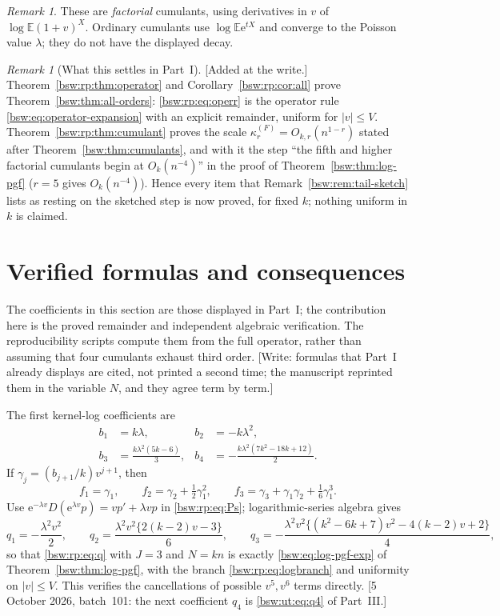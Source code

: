 \documentclass[11pt,letterpaper]{article}
\theoremstyle{definition}
\theoremstyle{remark}
\newtheorem{remark}[theorem]{Remark}
\newcommand{\EE}{\mathbb E}
\newcommand{\ee}{\mathrm e}
\begin{document}
\begin{remark}\label{bsw:rp:rem:factorial}
These are \emph{factorial} cumulants, using derivatives in $v$ of
$\log\EE(1+v)^X$.  Ordinary cumulants use $\log\EE\ee^{tX}$ and converge to
the Poisson value $\lambda$; they do not have the displayed decay.
\end{remark}

\begin{remark}[What this settles in Part~I]\label{bsw:rp:rem:settles}
[Added at the write.]  Theorem~\ref{bsw:rp:thm:operator} and
Corollary~\ref{bsw:rp:cor:all} prove Theorem~\ref{bsw:thm:all-orders}:
\eqref{bsw:rp:eq:operr} is the operator rule
\eqref{bsw:eq:operator-expansion} with an explicit remainder, uniform for
$|v|\le V$.  Theorem~\ref{bsw:rp:thm:cumulant} proves the scale
$\kappa_r^{(F)}=O_{k,r}(n^{1-r})$ stated after
Theorem~\ref{bsw:thm:cumulants}, and with it the step ``the fifth and
higher factorial cumulants begin at $O_k(n^{-4})$'' in the proof of
Theorem~\ref{bsw:thm:log-pgf} ($r=5$ gives $O_k(n^{-4})$).  Hence every
item that Remark~\ref{bsw:rem:tail-sketch} lists as resting on the sketched
step is now proved, for fixed $k$; nothing uniform in $k$ is claimed.
\end{remark}

\section{Verified formulas and consequences}\label{bsw:rp:sec:verified}

The coefficients in this section are those displayed in Part~I; the
contribution here is the proved remainder and independent algebraic
verification.  The reproducibility scripts compute them from the full
operator, rather than assuming that four cumulants exhaust third order.
[Write: formulas that Part~I already displays are cited, not printed a
second time; the manuscript reprinted them in the variable $N$, and they
agree term by term.]

The first kernel-log coefficients are
\begin{align*}
 b_1&=k\lambda,& b_2&=-k\lambda^2,\\
 b_3&=\frac{k\lambda^2(5k-6)}3,&
 b_4&=-\frac{k\lambda^2(7k^2-18k+12)}2.
\end{align*}
If $\gamma_j=(b_{j+1}/k)v^{j+1}$, then
\[
 f_1=\gamma_1,\qquad f_2=\gamma_2+\tfrac12\gamma_1^2,\qquad
 f_3=\gamma_3+\gamma_1\gamma_2+\tfrac16\gamma_1^3.
\]
Use $\ee^{-\lambda v}D(\ee^{\lambda v}p)=vp'+\lambda vp$ in
\eqref{bsw:rp:eq:Ps}; logarithmic-series algebra gives
\begin{equation}\label{bsw:rp:eq:q123}
 q_1=-\frac{\lambda^2v^2}{2},\qquad
 q_2=\frac{\lambda^2v^2\{2(k-2)v-3\}}{6},\qquad
 q_3=-\frac{\lambda^2v^2\{(k^2-6k+7)v^2-4(k-2)v+2\}}{4},
\end{equation}
so that \eqref{bsw:rp:eq:q} with $J=3$ and $N=kn$ is exactly
\eqref{bsw:eq:log-pgf-exp} of Theorem~\ref{bsw:thm:log-pgf}, with the
branch \eqref{bsw:rp:eq:logbranch} and uniformity on $|v|\le V$.  This
verifies the cancellations of possible $v^5,v^6$ terms directly.
[5 October 2026, batch~101: the next coefficient $q_4$ is
\eqref{bsw:ut:eq:q4} of Part~III.]
\end{document}
